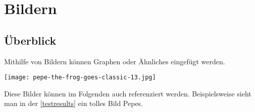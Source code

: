 \section{Bildern}

\subsection{Überblick}
Mithilfe von Bildern können Graphen oder Ähnliches eingefügt werden. 
\begin{center}
\captionsetup{type=figure}
\texttt{[image: pepe-the-frog-goes-classic-13.jpg]}
\label{testresults}
\end{center}
Diese Bilder können im Folgenden auch referenziert werden. Beispielsweise sieht man in der \autoref{testresults} ein tolles Bild Pepes.
